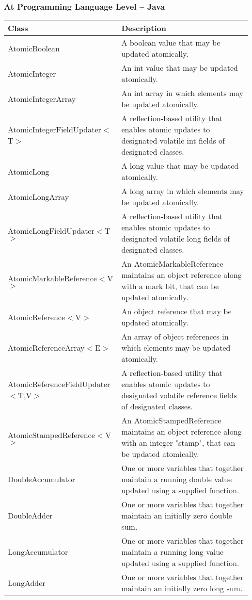 \subsubsection{At Programming Language Level – Java}
\begin{table}[h]
\centering
\begin{tabular}{|p{5.7cm}|p{10cm}|}
\hline
\textbf{Class} & \textbf{Description} \\ \hline
AtomicBoolean & A boolean value that may be updated atomically. \\ \hline
AtomicInteger & An int value that may be updated atomically. \\ \hline
AtomicIntegerArray & An int array in which elements may be updated atomically. \\ \hline
AtomicIntegerFieldUpdater$<$T$>$ & A reflection-based utility that enables atomic updates to designated volatile int fields of designated classes. \\ \hline
AtomicLong & A long value that may be updated atomically. \\ \hline
AtomicLongArray & A long array in which elements may be updated atomically. \\ \hline
AtomicLongFieldUpdater$<$T$>$ & A reflection-based utility that enables atomic updates to designated volatile long fields of designated classes. \\ \hline
AtomicMarkableReference$<$V$>$ & An AtomicMarkableReference maintains an object reference along with a mark bit, that can be updated atomically. \\ \hline
AtomicReference$<$V$>$ & An object reference that may be updated atomically. \\ \hline
AtomicReferenceArray$<$E$>$ & An array of object references in which elements may be updated atomically. \\ \hline
AtomicReferenceFieldUpdater$<$T,V$>$ & A reflection-based utility that enables atomic updates to designated volatile reference fields of designated classes. \\ \hline
AtomicStampedReference$<$V$>$ & An AtomicStampedReference maintains an object reference along with an integer "stamp", that can be updated atomically. \\ \hline
DoubleAccumulator & One or more variables that together maintain a running double value updated using a supplied function. \\ \hline
DoubleAdder & One or more variables that together maintain an initially zero double sum. \\ \hline
LongAccumulator & One or more variables that together maintain a running long value updated using a supplied function. \\ \hline
LongAdder & One or more variables that together maintain an initially zero long sum. \\ \hline
\end{tabular}
\end{table}

